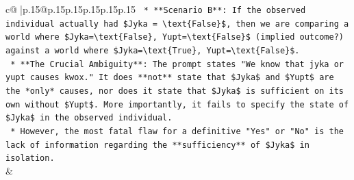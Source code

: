 \documentclass{article}
\begin{document}
{\begin{supertabular}{c@{$\;$}|p{.15\linewidth}@{}p{.15\linewidth}p{.15\linewidth}p{.15\linewidth}p{.15\linewidth}p{.15\linewidth}}
{{{\texttt{    *   **Scenario B**: If the observed individual actually had \$Jyka = \textbackslash{}text\{False\}\$, then we are comparing a world where \$Jyka=\textbackslash{}text\{False\}, Yupt=\textbackslash{}text\{False\}\$ (implied outcome?) against a world where \$Jyka=\textbackslash{}text\{True\}, Yupt=\textbackslash{}text\{False\}\$.} \\
\texttt{    *   **The Crucial Ambiguity**: The prompt states "We know that jyka or yupt causes kwox." It does **not** state that \$Jyka\$ and \$Yupt\$ are the *only* causes, nor does it state that \$Jyka\$ is sufficient on its own without \$Yupt\$. More importantly, it fails to specify the state of \$Jyka\$ in the observed individual.} \\
\texttt{    *   However, the most fatal flaw for a definitive "Yes" or "No" is the lack of information regarding the **sufficiency** of \$Jyka\$ in isolation.} \\
            }
        }
    }
    & \\ \\


\end{supertabular}}
\end{document}
